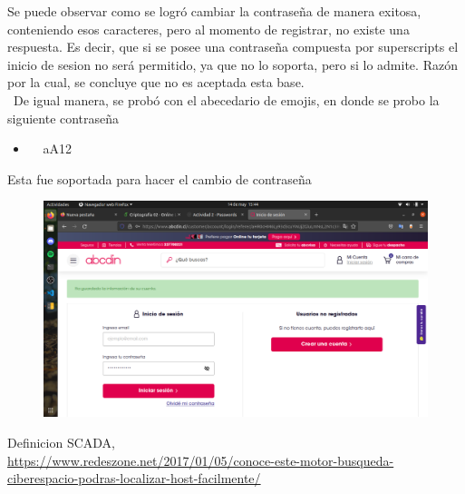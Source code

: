 \documentclass[]{article}
\begin{document}
Se puede observar como se logró cambiar la contraseña de manera exitosa, conteniendo esos caracteres, pero al momento de registrar, no existe una respuesta. Es decir, que
si se posee una contraseña compuesta por superscripts el inicio de sesion no será permitido, ya que no lo soporta, pero si lo admite. Razón por la cual, se concluye que no
es aceptada esta base.
\\\
De igual manera, se probó con el abecedario de emojis, en donde se probo la siguiente contraseña
\begin{itemize}
    \item 🌝💓😢🙉aA12
\end{itemize}

Esta fue soportada para hacer el cambio de contraseña
\begin{figure}
    \centering
    \includegraphics[width=15cm]{emojiscl.png}
\end{figure}

Definicion SCADA,
\\\url{https://www.redeszone.net/2017/01/05/conoce-este-motor-busqueda-ciberespacio-podras-localizar-host-facilmente/}
\\
\end{document}
